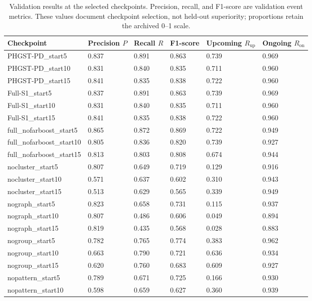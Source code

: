 \begin{table}[htbp]
\centering
\scriptsize
\caption{Validation results at the selected checkpoints. Precision, recall, and F1-score are validation event metrics. These values document checkpoint selection, not held-out superiority; proportions retain the archived 0--1 scale.}
\label{tab:checkpoint-validation-event}
\begin{tabularx}{\textwidth}{@{}lXXXXX@{}}
\toprule
Checkpoint & Precision $P$ & Recall $R$ & F1-score & Upcoming $R_{\mathrm{up}}$ & Ongoing $R_{\mathrm{on}}$ \\
\midrule
PHGST-PD\_start5 & 0.837 & 0.891 & 0.863 & 0.739 & 0.969 \\
PHGST-PD\_start10 & 0.831 & 0.840 & 0.835 & 0.711 & 0.960 \\
PHGST-PD\_start15 & 0.841 & 0.835 & 0.838 & 0.722 & 0.960 \\
Full-S1\_start5 & 0.837 & 0.891 & 0.863 & 0.739 & 0.969 \\
Full-S1\_start10 & 0.831 & 0.840 & 0.835 & 0.711 & 0.960 \\
Full-S1\_start15 & 0.841 & 0.835 & 0.838 & 0.722 & 0.960 \\
full\_nofarboost\_start5 & 0.865 & 0.872 & 0.869 & 0.722 & 0.949 \\
full\_nofarboost\_start10 & 0.805 & 0.836 & 0.820 & 0.739 & 0.927 \\
full\_nofarboost\_start15 & 0.813 & 0.803 & 0.808 & 0.674 & 0.944 \\
nocluster\_start5 & 0.807 & 0.649 & 0.719 & 0.129 & 0.916 \\
nocluster\_start10 & 0.571 & 0.637 & 0.602 & 0.310 & 0.943 \\
nocluster\_start15 & 0.513 & 0.629 & 0.565 & 0.339 & 0.949 \\
nograph\_start5 & 0.823 & 0.658 & 0.731 & 0.115 & 0.937 \\
nograph\_start10 & 0.807 & 0.486 & 0.606 & 0.049 & 0.894 \\
nograph\_start15 & 0.819 & 0.435 & 0.568 & 0.028 & 0.883 \\
nogroup\_start5 & 0.782 & 0.765 & 0.774 & 0.383 & 0.962 \\
nogroup\_start10 & 0.663 & 0.790 & 0.721 & 0.636 & 0.934 \\
nogroup\_start15 & 0.620 & 0.760 & 0.683 & 0.609 & 0.927 \\
nopattern\_start5 & 0.789 & 0.671 & 0.725 & 0.166 & 0.930 \\
nopattern\_start10 & 0.598 & 0.659 & 0.627 & 0.360 & 0.939 \\

\end{tabularx}
\end{table}
